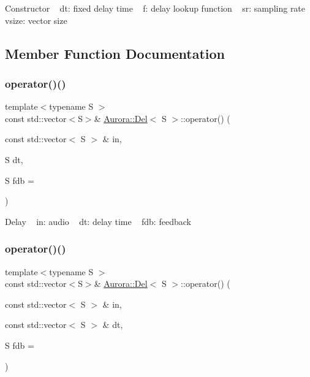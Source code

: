 Constructor ~\newline
dt\+: fixed delay time ~\newline
f\+: delay lookup function ~\newline
sr\+: sampling rate ~\newline
vsize\+: vector size 

\subsection{Member Function Documentation}
\mbox{\label{class_aurora_1_1_del_aa45ad145253210b01c24b3d0b82a2dd9}} 
\subsubsection{\texorpdfstring{operator()()}{operator()()}\hspace{0.1cm}{\footnotesize\ttfamily [1/2]}}
{\footnotesize\ttfamily template$<$typename S $>$ \\
const std\+::vector$<$S$>$\& \hyperlink{class_aurora_1_1_del}{Aurora\+::\+Del}$<$ S $>$\+::operator() (\begin{DoxyParamCaption}\item[{const std\+::vector$<$ S $>$ \&}]{in,  }\item[{S}]{dt,  }\item[{S}]{fdb = {} }\end{DoxyParamCaption})\hspace{0.3cm}{\ttfamily [inline]}}

Delay ~\newline
in\+: audio ~\newline
dt\+: delay time ~\newline
fdb\+: feedback \mbox{\label{class_aurora_1_1_del_a504900b27ce5849bebe55a675db175bd}} 
\subsubsection{\texorpdfstring{operator()()}{operator()()}\hspace{0.1cm}{\footnotesize\ttfamily [2/2]}}
{\footnotesize\ttfamily template$<$typename S $>$ \\
const std\+::vector$<$S$>$\& \hyperlink{class_aurora_1_1_del}{Aurora\+::\+Del}$<$ S $>$\+::operator() (\begin{DoxyParamCaption}\item[{const std\+::vector$<$ S $>$ \&}]{in,  }\item[{const std\+::vector$<$ S $>$ \&}]{dt,  }\item[{S}]{fdb = {} }\end{DoxyParamCaption})\hspace{0.3cm}{\ttfamily [inline]}}

